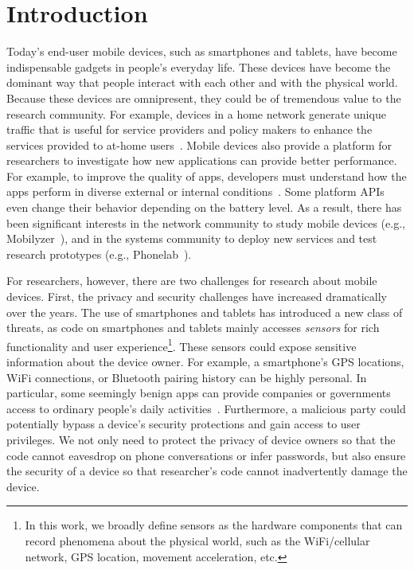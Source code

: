 \section{Introduction}

Today's end-user mobile devices, such as smartphones and
tablets, have become indispensable gadgets in people's everyday
life. These devices have become the dominant way that 
people interact with each other and with the physical world. Because 
these devices are omnipresent, they could be of tremendous value to 
the research community. For example, devices in a home network  
generate unique traffic that is useful for service providers and policy
makers to enhance the services provided to at-home 
users~\cite{sundaresan2011broadband}.
Mobile devices also provide a platform for researchers to
investigate how new applications can provide better performance.
For example, to improve the quality of apps, developers must 
understand how the apps perform in diverse external or internal
conditions~\cite{ravindranath2012appinsight}. Some platform
APIs even change their behavior depending on the battery level.
As a result, there has been significant interests in the network
community to study mobile devices
(e.g., Mobilyzer~\cite{nikravesh2015mobilyzer}), and in the
systems community to deploy new services and test research
prototypes (e.g., Phonelab~\cite{phonelab, nandugudi2013phonelab}).  
					
For researchers, however, there are two challenges for research
about mobile devices. First, the privacy and security challenges
have increased dramatically over the years. The use of 
smartphones and tablets has introduced a new class of threats, 
as code on smartphones and tablets mainly accesses
\textit{sensors} for rich functionality and user experience\footnote{\scriptsize In 
this work, we broadly define sensors as the hardware components 
that can record phenomena about the physical world, such as the 
WiFi/cellular network, GPS location, movement acceleration, etc.}. 
These sensors could expose sensitive information about the device 
owner. For example, a smartphone's GPS locations,
WiFi connections, or Bluetooth pairing history can be highly
personal. In particular, some seemingly benign apps can provide 
companies or governments access to ordinary 
people's daily activities~\cite{AngryBirds}. Furthermore, 
a malicious party could potentially bypass a
device's security protections and gain access to user
privileges. We not only need to  protect the privacy
of device owners so that the code cannot eavesdrop on phone
conversations or infer passwords, but also ensure the security of a device
so that researcher's code cannot inadvertently damage 
the device.

